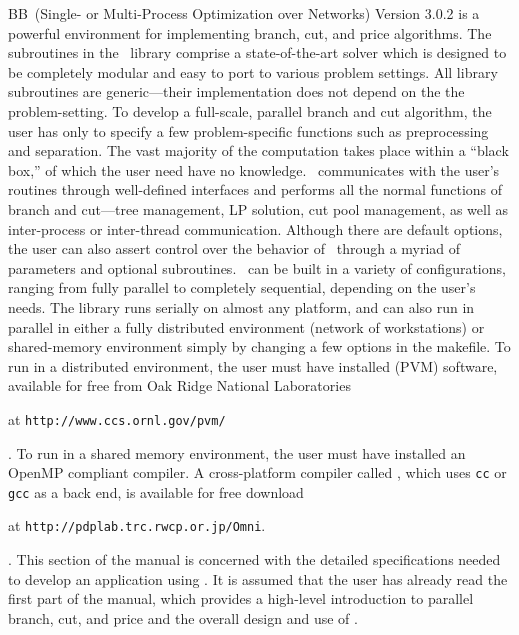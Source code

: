 BB\ (Single- or Multi-Process Optimization over Networks) Version 3.0.2
is a powerful environment for implementing branch, cut, and price
algorithms. The subroutines in the \BB\ library comprise a
state-of-the-art solver which is designed to be completely modular and
easy to port to various problem settings. All library subroutines are
generic---their implementation does not depend on the the
problem-setting. To develop a full-scale, parallel branch and cut
algorithm, the user has only to specify a few problem-specific
functions such as preprocessing and separation. The vast majority of
the computation takes place within a ``black box,'' of which the user
need have no knowledge. \BB\ communicates with the user's routines
through well-defined interfaces and performs all the normal functions
of branch and cut---tree management, LP solution, cut pool management,
as well as inter-process or inter-thread communication. Although there
are default options, the user can also assert control over the
behavior of \BB\ through a myriad of parameters and optional
subroutines. \BB\ can be built in a variety of configurations, ranging
from fully parallel to completely sequential, depending on the user's
needs. The library runs serially on almost any platform, and can also
run in parallel in either a fully distributed environment (network of
workstations) or shared-memory environment simply by changing a few
options in the makefile. To run in a distributed environment, the
user must have installed {\em {}} (PVM) software, available for
free from Oak Ridge National Laboratories
\begin{latexonly}
at {\tt http://www.ccs.ornl.gov/pvm/} 
\end{latexonly}. 
To run in a shared memory environment, the user must have installed an
OpenMP compliant compiler. A cross-platform compiler called {\em
{}}, which uses 
{\tt cc} or {\tt gcc} as a back end, is available for free download
\begin{latexonly}
at {\tt http://pdplab.trc.rwcp.or.jp/Omni}.
\end{latexonly}.
This section of the manual is concerned with the detailed
specifications needed to develop an application using \BB. It is
assumed that the user has already read the first part of the manual, which
provides a high-level introduction to parallel branch, cut, and price
and the overall design and use of \BB. 

